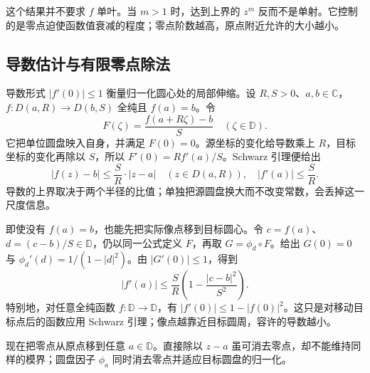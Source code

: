 这个结果并不要求 \(f\) 单叶。当 \(m>1\) 时，达到上界的 \(z^m\) 反而不是单射。它控制的是零点迫使函数值衰减的程度；零点阶数越高，原点附近允许的大小越小。

\subsection{导数估计与有限零点除法}
\label{b3:subsec:060102}

导数形式 \(|f'(0)|\le1\) 衡量归一化圆心处的局部伸缩。设 \(R,S>0\)、\(a,b\in\mathbb C\)，\(f:D(a,R)\to D(b,S)\) 全纯且 \(f(a)=b\)。令
\[
 F(\zeta)=\frac{f(a+R\zeta)-b}{S}\quad(\zeta\in\mathbb D).
\]
它把单位圆盘映入自身，并满足 \(F(0)=0\)。源坐标的变化给导数乘上 \(R\)，目标坐标的变化再除以 \(S\)，所以 \(F'(0)=Rf'(a)/S\)。Schwarz 引理便给出
\[
 |f(z)-b|\le\frac SR\cdot|z-a|\quad(z\in D(a,R)),
 \quad |f'(a)|\le\frac SR.
\]
导数的上界取决于两个半径的比值；单独把源圆盘换大而不改变常数，会丢掉这一尺度信息。

\ProseParagraphBreak

即使没有 \(f(a)=b\)，也能先把实际像点移到目标圆心。令 \(c=f(a)\)、\(d=(c-b)/S\in\mathbb D\)，仍以同一公式定义 \(F\)，再取 \(G=\phi_d\circ F\)。给出 \(G(0)=0\) 与 \(\phi_d'(d)=1/(1-|d|^2)\)。由 \(|G'(0)|\le1\)，得到
\begin{equation}\label{b3:eq:06-center-derivative}
 |f'(a)|\le\frac SR\left(1-\frac{|c-b|^2}{S^2}\right).
\end{equation}
特别地，对任意全纯函数 \(f:\mathbb D\to\mathbb D\)，有 \(|f'(0)|\le1-|f(0)|^2\)。这只是对移动目标点后的函数应用 Schwarz 引理；像点越靠近目标圆周，容许的导数越小。

\ProseParagraphBreak

现在把零点从原点移到任意 \(a\in\mathbb D\)。直接除以 \(z-a\) 虽可消去零点，却不能维持同样的模界；圆盘因子 \(\phi_a\) 同时消去零点并适应目标圆盘的归一化。

